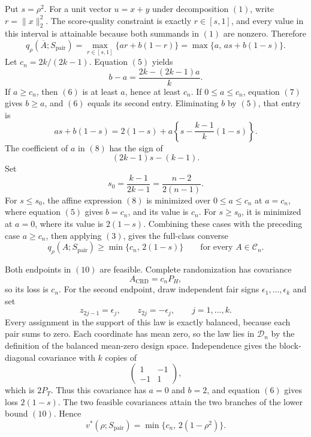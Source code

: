 Put \(s=\rho^2\).  For a unit vector \(u=x+y\) under decomposition \((1)\), write \(r=\|x\|_2^2\).  The score-quality constraint is exactly \(r\in[s,1]\), and every value in this interval is attainable because both summands in \((1)\) are nonzero.  Therefore
\[
q_\rho(\overline A;S_{\mathrm{pair}})
=\max_{r\in[s,1]}\{ar+b(1-r)\}
=\max\{a,\,as+b(1-s)\}.
\tag{6}
\]
Let \(c_n=2k/(2k-1)\).  Equation \((5)\) yields
\[
b-a=\frac{2k-(2k-1)a}{k}.
\tag{7}
\]
If \(a\geq c_n\), then \((6)\) is at least \(a\), hence at least \(c_n\).  If \(0\leq a\leq c_n\), equation \((7)\) gives \(b\geq a\), and \((6)\) equals its second entry.  Eliminating \(b\) by \((5)\), that entry is
\[
as+b(1-s)
=2(1-s)+a\left\{s-\frac{k-1}{k}(1-s)\right\}.
\tag{8}
\]
The coefficient of \(a\) in \((8)\) has the sign of
\[
(2k-1)s-(k-1).
\]
Set
\[
s_0=\frac{k-1}{2k-1}=\frac{n-2}{2(n-1)}.
\tag{9}
\]
For \(s\leq s_0\), the affine expression \((8)\) is minimized over \(0\leq a\leq c_n\) at \(a=c_n\), where equation \((5)\) gives \(b=c_n\), and its value is \(c_n\).  For \(s\geq s_0\), it is minimized at \(a=0\), where its value is \(2(1-s)\).  Combining these cases with the preceding case \(a\geq c_n\), then applying \((3)\), gives the full-class converse
\[
q_\rho(A;S_{\mathrm{pair}})
\geq \min\{c_n,\,2(1-s)\}
\qquad\text{for every }A\in\mathcal C_n.
\tag{10}
\]

Both endpoints in \((10)\) are feasible.  Complete randomization has covariance
\[
A_{\mathrm{CRD}}=c_nP_H,
\]
so its loss is \(c_n\).  For the second endpoint, draw independent fair signs \(\epsilon_1,\ldots,\epsilon_k\) and set
\[
z_{2j-1}=\epsilon_j,
\qquad
z_{2j}=-\epsilon_j,
\qquad j=1,\ldots,k.
\tag{11}
\]
Every assignment in the support of this law is exactly balanced, because each pair sums to zero.  Each coordinate has mean zero, so the law lies in \(\mathcal D_n\) by the definition of the balanced mean-zero design space.  Independence gives the block-diagonal covariance with \(k\) copies of
\[
\begin{pmatrix}1&-1\\-1&1\end{pmatrix},
\]
which is \(2P_T\).  Thus this covariance has \(a=0\) and \(b=2\), and equation \((6)\) gives loss \(2(1-s)\).  The two feasible covariances attain the two branches of the lower bound \((10)\).  Hence
\[
v^*(\rho;S_{\mathrm{pair}})
=\min\{c_n,\,2(1-\rho^2)\}.
\tag{12}
\]

